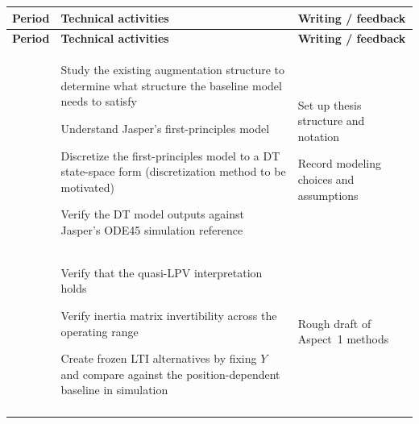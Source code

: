 \begin{longtable}{L{2.8cm} L{8.2cm} L{3.2cm}}
\toprule
\textbf{Period} & \textbf{Technical activities} & \textbf{Writing / feedback} \\
\midrule
\endfirsthead

\toprule
\textbf{Period} & \textbf{Technical activities} & \textbf{Writing / feedback} \\
\midrule
\endhead

\bottomrule
\endfoot


&
\begin{tightitemize}
    \item Study the existing augmentation structure to determine what structure the baseline model needs to satisfy
    \item Understand Jasper's first-principles model
    \item Discretize the first-principles model to a DT state-space form (discretization method to be motivated)
    \item Verify the DT model outputs against Jasper's ODE45 simulation reference
\end{tightitemize}
&
\begin{tightitemize}
    \item Set up thesis structure and notation
    \item Record modeling choices and assumptions
\end{tightitemize}
\\
\addlinespace[0.35em]

&
\begin{tightitemize}
    \item Verify that the quasi-LPV interpretation holds
    \item Verify inertia matrix invertibility across the operating range 
    \item Create frozen LTI alternatives by fixing $Y$ and compare against the position-dependent baseline in simulation
\end{tightitemize}
&
\begin{tightitemize}
    \item Rough draft of Aspect~1 methods
\end{tightitemize}
\\
\addlinespace[0.35em]


\end{longtable}
